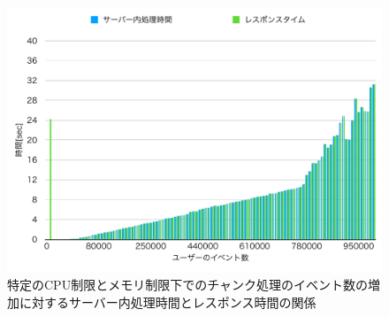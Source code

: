 \documentclass[../../../../../../main]{subfiles}
\begin{document}
    \begin{figure}[H]
        \centering
        \includegraphics[width=12cm]{graph}
        \caption{特定のCPU制限とメモリ制限下でのチャンク処理のイベント数の増加に対するサーバー内処理時間とレスポンス時間の関係}
        \label{fig:stream-time-app_1_1024-db_1_1024}
    \end{figure}
\end{document}
